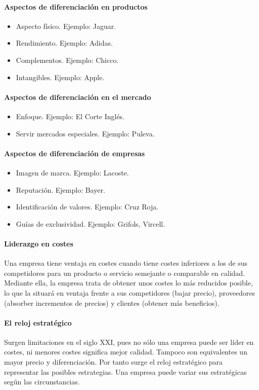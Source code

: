 \documentclass[12pt]{article}
\theoremstyle{definition_wo_parentheses}
\begin{document}
\paragraph{Aspectos de diferenciación en productos}
\begin{itemize}
\item Aspecto físico. Ejemplo: Jaguar.
\item Rendimiento. Ejemplo: Adidas.
\item Complementos. Ejemplo: Chicco.
\item Intangibles. Ejemplo: Apple.
\end{itemize}

\paragraph{Aspectos de diferenciación en el mercado}
\begin{itemize}
\item Enfoque. Ejemplo: El Corte Inglés.
\item Servir mercados especiales. Ejemplo: Puleva.
\end{itemize}

\paragraph{Aspectos de diferenciación de empresas}
\begin{itemize}
\item Imagen de marca. Ejemplo: Lacoste.
\item Reputación. Ejemplo: Bayer.
\item Identificación de valores. Ejemplo: Cruz Roja.
\item Guías de exclusividad. Ejemplo: Grifols, Vircell.
\end{itemize}

\paragraph{Liderazgo en costes} Una empresa tiene ventaja en costes cuando tiene costes inferiores a los de sus competidores para un producto o servicio semejante o comparable en calidad. Mediante ella, la empresa trata de obtener unos costes lo más reducidos posible, lo que la situará en ventaja frente a sus competidores (bajar precio), proveedores (absorber incrementos de precios) y clientes (obtener más beneficios).

\paragraph{El reloj estratégico} Surgen limitaciones en el siglo XXI, pues no sólo una empresa puede ser líder en costes, ni menores costes significa mejor calidad. Tampoco son equivalentes un mayor precio y diferenciación. Por tanto surge el reloj estratégico para representar las posibles estrategias. Una empresa puede variar sus estratégicas según las circunstancias. 
\end{document}
